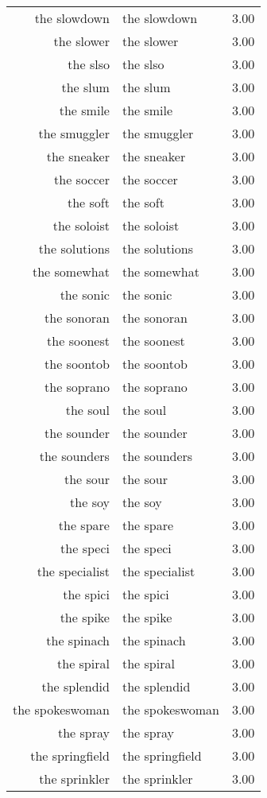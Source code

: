\begin{table}[ht]
\begin{tabular}{rlr}
  the slowdown & the slowdown & 3.00 \\ 
  the slower & the slower & 3.00 \\ 
  the slso & the slso & 3.00 \\ 
  the slum & the slum & 3.00 \\ 
  the smile & the smile & 3.00 \\ 
  the smuggler & the smuggler & 3.00 \\ 
  the sneaker & the sneaker & 3.00 \\ 
  the soccer & the soccer & 3.00 \\ 
  the soft & the soft & 3.00 \\ 
  the soloist & the soloist & 3.00 \\ 
  the solutions & the solutions & 3.00 \\ 
  the somewhat & the somewhat & 3.00 \\ 
  the sonic & the sonic & 3.00 \\ 
  the sonoran & the sonoran & 3.00 \\ 
  the soonest & the soonest & 3.00 \\ 
  the soontob & the soontob & 3.00 \\ 
  the soprano & the soprano & 3.00 \\ 
  the soul & the soul & 3.00 \\ 
  the sounder & the sounder & 3.00 \\ 
  the sounders & the sounders & 3.00 \\ 
  the sour & the sour & 3.00 \\ 
  the soy & the soy & 3.00 \\ 
  the spare & the spare & 3.00 \\ 
  the speci & the speci & 3.00 \\ 
  the specialist & the specialist & 3.00 \\ 
  the spici & the spici & 3.00 \\ 
  the spike & the spike & 3.00 \\ 
  the spinach & the spinach & 3.00 \\ 
  the spiral & the spiral & 3.00 \\ 
  the splendid & the splendid & 3.00 \\ 
  the spokeswoman & the spokeswoman & 3.00 \\ 
  the spray & the spray & 3.00 \\ 
  the springfield & the springfield & 3.00 \\ 
  the sprinkler & the sprinkler & 3.00 \\ 

\end{tabular}
\end{table}
